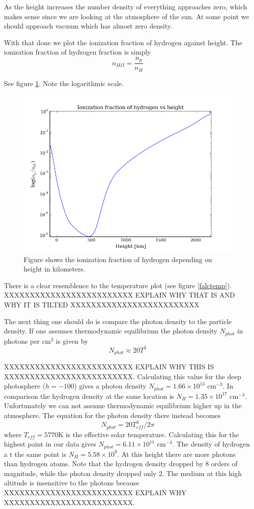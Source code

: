 \documentclass{aa}   %
\begin{document}
As the height increases the number density of everything approaches zero, which makes sense since we are looking at the atmosphere of the sun. At some point we should approach vacuum which has almost zero density.

With that done we plot the ionization fraction of hydrogen against height. 
The ionization fraction of hydrogen fraction is simply
\begin{equation}
 n_{HII} = \frac{n_p}{n_H}
\end{equation}

See figure \ref{hyd_ion}. Note the logarithmic scale.
\begin{figure}
 \includegraphics[width=.49\textwidth]{hyd_ion.png}
 \caption{Figure shows the ionization fraction of hydrogen depending on height in kilometers.}
 \label{hyd_ion} 
\end{figure}
There is a clear resemblence to the temperature plot (see figure \ref{falctemp}).
XXXXXXXXXXXXXXXXXXXXXXXXX EXPLAIN WHY THAT IS AND WHY IT IS TILTED XXXXXXXXXXXXXXXXXXXXXXXXX



The next thing one should do is compare the photon density to the particle density.
If one assumes thermodynamic equilibrium the photon density $N_{phot}$ in photons per cm$^3$ is given by
\begin{equation}
 N_{phot} \approx 20T^3
\end{equation}

XXXXXXXXXXXXXXXXXXXXXXXXX EXPLAIN WHY THIS IS XXXXXXXXXXXXXXXXXXXXXXXXX.
Calculating this value for the deep photosphere ($h = -100$) gives a photon density $N_{phot} = 1.66\times10^{13}$ cm$^{-3}$. In comparison the hydrogen density at the same location is $N_H = 1.35\times10^{17}$ cm$^{-3}$. 
Unfortunately we can not assume thermodynamic equilibrium higher up in the atmosphere. The equation for the photon density there instead becomes
\begin{equation}
 N_{phot} = 20T_{eff}^3/2\pi
\end{equation}
where $T_{eff} = 5770$K is the effective solar temperature.
Calculating this for the highest point in our data gives $N_{phot} = 6.11\times 10^{11}$ cm$^{-3}$. The density of hydrogen a
t the same point is $N_H = 5.58\times 10^9$. At this height there are more photons than hydrogen atoms. Note that the hydrogen density dropped by 8 orders of magnitude, while the photon density dropped only 2.
The medium at this high altitude is insensitive to the photons because XXXXXXXXXXXXXXXXXXXXXXXXX EXPLAIN WHY XXXXXXXXXXXXXXXXXXXXXXXXX.
\end{document}
